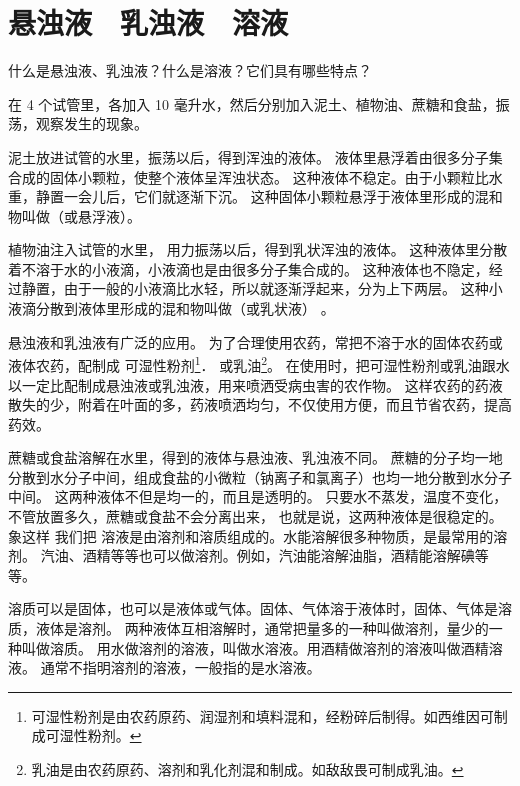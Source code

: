 \section{悬浊液　乳浊液　溶液}\label{sec:4-1}

什么是悬浊液、乳浊液？什么是溶液？它们具有哪些特点？

\begin{shiyan}
    在 4 个试管里，各加入 10 毫升水，然后分别加入泥土、植物油、蔗糖和食盐，振荡，观察发生的现象。
\end{shiyan}

泥土放进试管的水里，振荡以后，得到浑浊的液体。
液体里悬浮着由很多分子集合成的固体小颗粒，使整个液体呈浑浊状态。
这种液体不稳定。由于小颗粒比水重，静置一会儿后，它们就逐渐下沉。
这种固体小颗粒悬浮于液体里形成的混和物叫做（或悬浮液）。

植物油注入试管的水里， 用力振荡以后，得到乳状浑浊的液体。
这种液体里分散着不溶于水的小液滴，小液滴也是由很多分子集合成的。
这种液体也不隐定，经过静置，由于一般的小液滴比水轻，所以就逐渐浮起来，分为上下两层。
这种小液滴分散到液体里形成的混和物叫做（或乳状液） 。

悬浊液和乳浊液有广泛的应用。
为了合理使用农药，常把不溶于水的固体农药或液体农药，配制成
可湿性粉剂\footnote{可湿性粉剂是由农药原药、润湿剂和填料混和，经粉碎后制得。如西维因可制成可湿性粉剂。}．
或乳油\footnote{乳油是由农药原药、溶剂和乳化剂混和制成。如敌敌畏可制成乳油。}。
在使用时，把可湿性粉剂或乳油跟水以一定比配制成悬浊液或乳浊液，用来喷洒受病虫害的农作物。
这样农药的药液散失的少，附着在叶面的多，药液喷洒均匀，不仅使用方便，而且节省农药，提高药效。

蔗糖或食盐溶解在水里，得到的液体与悬浊液、乳浊液不同。
蔗糖的分子均一地分散到水分子中间，组成食盐的小微粒（钠离子和氯离子）也均一地分散到水分子中间。
这两种液体不但是均一的，而且是透明的。
只要水不蒸发，温度不变化，不管放置多久，蔗糖或食盐不会分离出来，
也就是说，这两种液体是很稳定的。象这样%
我们把
溶液是由溶剂和溶质组成的。水能溶解很多种物质，是最常用的溶剂。
汽油、酒精等等也可以做溶剂。例如，汽油能溶解油脂，酒精能溶解碘等等。

溶质可以是固体，也可以是液体或气体。固体、气体溶于液体时，固体、气体是溶质，液体是溶剂。
两种液体互相溶解时，通常把量多的一种叫做溶剂，量少的一种叫做溶质。
用水做溶剂的溶液，叫做水溶液。用酒精做溶剂的溶液叫做酒精溶液。
通常不指明溶剂的溶液，一般指的是水溶液。


